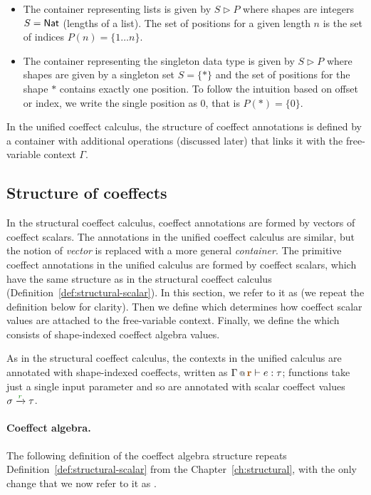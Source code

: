 \begin{itemize}
\item The container representing lists is given by $S \triangleright P$ where
  shapes are integers $S = \ident{Nat}$ (lengths of a list). The set of positions for a
  given length $n$ is the set of indices $P(n)= \{ 1 \ldots n \}$.

\item The container representing the singleton data type is given by $S \triangleright P$ where
  shapes are given by a singleton set $S = \{ \ast \}$ and the set of positions for the
  shape $\ast$ contains exactly one position. To follow the intuition based on offset or
  index, we write the single position as $0$, that is $P(\ast) = \{ 0 \}$.
\end{itemize}

\noindent
In the unified coeffect calculus, the structure of coeffect annotations is defined by a
container with additional operations (discussed later) that links it with the free-variable
context $\Gamma$.

\subsection{Structure of coeffects}
In the structural coeffect calculus, coeffect annotations are formed by vectors of coeffect
scalars. The annotations in the unified coeffect calculus are similar, but the notion of \emph{vector}
is replaced with a more general \emph{container}. The primitive coeffect annotations in the unified
calculus are formed by coeffect scalars, which have the same structure as in the structural
coeffect calculus (Definition~\ref{def:structural-scalar}). In this section, we refer to it as
\emph{} (we repeat the definition below for clarity).
Then we define \emph{} which determines how coeffect
scalar values are attached to the free-variable context. Finally, we define the
\emph{} which consists of shape-indexed coeffect algebra values.

As in the structural coeffect calculus, the contexts in the unified calculus are annotated with
shape-indexed coeffects, written as $\coctx{\Gamma}{\aclrd{\textbf{r}}} \vdash e : \tau$;
functions take just a single input parameter and so are annotated with scalar coeffect values
$\sigma \xrightarrow{\cclrd{r}} \tau$.

\paragraph{Coeffect algebra.}
The following definition of the coeffect algebra structure repeats
Definition~\ref{def:structural-scalar} from the Chapter~\ref{ch:structural}, with the only change
that we now refer to it as \emph{}.

